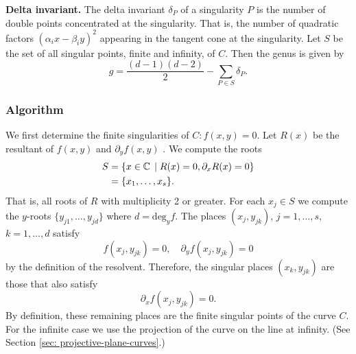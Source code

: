 {\bf Delta invariant.} The delta invariant $\delta_P$ of a singularity
$P$ is the number of double points concentrated at the singularity. That
is, the number of quadratic factors $(\alpha_i x - \beta_i y)^2$
appearing in the tangent cone at the singularity. Let $S$ be the set of
all singular points, finite and infinity, of $C$. Then the genus is
given by
\[
    g = \frac{(d-1)(d-2)}{2} - \sum_{P \in S} \delta_P.
\]


%
\subsubsection*{Algorithm}
%

We first determine the finite singularities of $C : f(x,y) = 0$. Let
$R(x)$ be the resultant of $f(x,y)$ and $\partial_y f(x,y)$
\cite{Griffiths89}. We compute the roots
\begin{align*}
    S &= \{ x \in \operatorname{\mathbb{C}} \; | \; R(x) = 0, \partial_x R(x) = 0 \} \\
      &= \{ x_1, \ldots, x_s \}.
\end{align*}
That is, all roots of $R$ with multiplicity 2 or greater. For each $x_j
\in S$ we compute the $y$-roots $\{y_{j1},\ldots,y_{jd}\}$ where $d =
\text{deg}_y f$. The places $(x_j,y_{jk})$, $j=1,\ldots,s$,
$k=1,\ldots,d$ satisfy
\[
    f(x_j,y_{jk}) = 0, \quad \partial_y f(x_j,y_{jk}) = 0
\]
by the definition of the resolvent. Therefore, the singular places
$(x_k,y_{jk})$ are those that also satisfy
\[
    \partial_x f(x_j,y_{jk}) = 0.
\]
By definition, these remaining places are the finite singular points of
the curve $C$. For the infinite case we use the projection of the curve
on the line at infinity. (See Section \ref{sec:
  projective-plane-curves}.)




